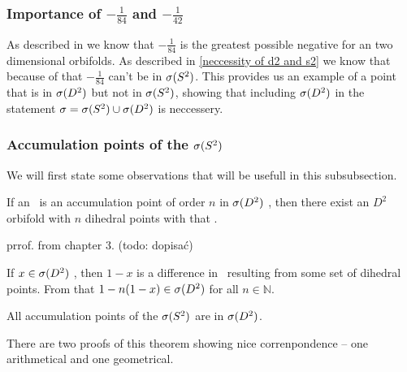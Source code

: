 \subsubsection{Importance of $-\frac{1}{84}$ and $-\frac{1}{42}$}
As described in \cite{greatest negative orbifold} we know that $-\frac{1}{84}$ is 
the greatest possible negative \Eoc for an two dimensional orbifolds. 
As described in \ref{neccessity of d2 and s2} 
we know that because of that $-\frac{1}{84}$ can't be in ${{\sigma}(S^2)}$. 
This provides us an example of a point that is in ${{\sigma}(D^2)}$ but not in ${{\sigma}(S^2)}$, showing that 
including ${{\sigma}(D^2)}$ in the statement ${\sigma} = {{\sigma}(S^2)} \cup {{\sigma}(D^2)}$ is neccessery.





\subsubsection{Accumulation points of the ${{\sigma}(S^2)}$}
We will first state some observations that will be usefull in this subsubsection.
\begin{observation}
If an \Eoc\ is an accumulation point of order $n$ in ${{\sigma}(D^2)}$ , 
then there exist an $D^2$  
orbifold with $n$ dihedral  points with that \Eoc. 
\end{observation}
prrof. from chapter 3. (todo: dopisać)
\begin{observation}\label{adding_multiplied_differences}
If $x \in {{\sigma}(D^2)}$ , then $1-x$  is 
a difference in 
\Eoc\ resulting 
from some set of dihedral  points. From that $1-n(1-x) \in {{\sigma}(D^2)}$ 
for all $n \in \mathbb{N}$. 
\end{observation}
\begin{theorem}
All accumulation points of the ${{\sigma}(S^2)}$ are in ${{\sigma}(D^2)}$.
\end{theorem}
There are two proofs of this theorem showing nice correnpondence -- one arithmetical and 
one geometrical. 
